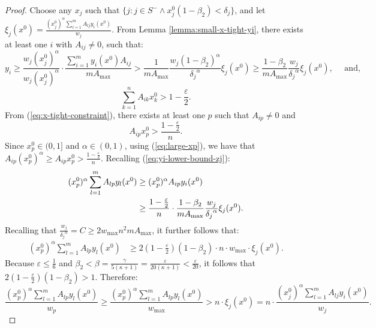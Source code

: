\documentclass[11pt]{article}
\begin{document}
\begin{proof}
Choose any $x_j$ such that $\{j: j\in S^- \wedge x_j^0(1-\beta_2)< \delta_j\}$, and let $\xi_j(x^0) = \frac{(x_j^0)^{\alpha}\sum_{l=1}^mA_{lj}y_i(x^0)}{w_j}$. From Lemma \ref{lemma:small-x-tight-yi}, there exists at least one $i$ with $A_{ij}\neq 0$, such that:
\begin{equation}
y_i \geq \frac{w_j (x_j^0)^\alpha}{w_j (x_j^0)^\alpha}\cdot \frac{\sum_{i=1}^m y_i(x^0) A_{ij}}{mA_{\max}} > \frac{1}{mA_{\max}}\frac{w_j(1-\beta_2)^\alpha}{{\delta_j}^{\alpha}}\xi_j(x^0)\geq \frac{1-\beta_2}{mA_{\max}}\frac{w_j}{{\delta_j}^{\alpha}}\xi_j(x^0), \label{eq:yi-lower-bound-zj} \quad\text{ and},
\end{equation}
\begin{equation}
\sum_{k=1}^n A_{ik}x_k^0 > 1-\frac{\varepsilon}{2} \label{eq:x-tight-constraint}.
\end{equation}
From (\ref{eq:x-tight-constraint}), there exists at least one $p$ such that $A_{ip}\neq 0$ and \begin{equation}
A_{ip}x_p^0>\frac{1-\frac{\varepsilon}{2}}{n}. \label{eq:large-xp}
\end{equation}
Since $x_p^0 \in (0, 1]$ and $\alpha \in (0, 1)$, using (\ref{eq:large-xp}), we have that $A_{ip} (x_p^0)^{\alpha}\geq A_{ip}x_p^0 > \frac{1-\frac{\varepsilon}{2}}{n}$. Recalling (\ref{eq:yi-lower-bound-zj}):
\begin{align}
(x_p^0)^{\alpha}\sum_{l=1}^m A_{lp}y_l(x^0) &\geq (x_p^0)^{\alpha}A_{ip}y_i(x^0)\notag\\
&\geq \frac{1-\frac{\varepsilon}{2}}{n}\cdot \frac{1-\beta_2}{mA_{\max}}\frac{w_j}{{\delta_j}^{\alpha}}\xi_j(x^0)\notag.
\end{align}
Recalling that $\frac{w_j}{{\delta_j}^{\alpha}} = C \geq 2w_{\max}n^2 m A_{\max}$, it further follows that:
\begin{align}
(x_p^0)^{\alpha}\sum_{l=1}^m A_{lp}y_l(x^0) &\geq 2\left(1-\frac{\varepsilon}{2}\right)(1-\beta_2)\cdot n \cdot w_{\max}\cdot\xi_j(x^0).\label{eq:alpha<1--main-cond-for-small-var-inc}
\end{align}
Because $\varepsilon\leq \frac{1}{6}$ and $\beta_2 < \beta = \frac{\gamma}{5(\kappa+1)} = \frac{\varepsilon}{20(\kappa+1)}<\frac{\varepsilon}{20}$, it follows that $ 2\left(1-\frac{\varepsilon}{2}\right)(1-\beta_2)>1$. Therefore:
\begin{equation}
\frac{(x_p^0)^{\alpha}\sum_{l=1}^m A_{lp}y_l(x^0) }{w_p}\geq \frac{(x_p^0)^{\alpha}\sum_{l=1}^m A_{lp}y_l(x^0) }{w_{\max}} >n\cdot \xi_j(x^0) = n\cdot \frac{(x_j^0)^{\alpha}\sum_{l=1}^mA_{lj}y_i(x^0)}{w_j}. \label{eq:alpha<1--small-var-inc-cond1}
\end{equation}


\end{proof}
\end{document}
